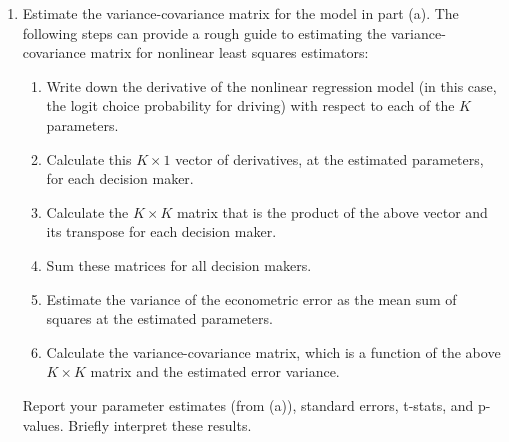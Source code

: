 \documentclass[11pt,letterpaper]{article}\usepackage[]{graphicx}\usepackage[]{color}
\begin{document}
\begin{enumerate}[label=\alph*., leftmargin=*]
	\item Estimate the variance-covariance matrix for the model in part (a). The following steps can provide a rough guide to estimating the variance-covariance matrix for nonlinear least squares estimators:
	\begin{enumerate}[label=\Roman*.]
		\item Write down the derivative of the nonlinear regression model (in this case, the logit choice probability for driving) with respect to each of the $K$ parameters.
		\item Calculate this $K \times 1$ vector of derivatives, at the estimated parameters, for each decision maker.
		\item Calculate the $K \times K$ matrix that is the product of the above vector and its transpose for each decision maker.
		\item Sum these matrices for all decision makers.
		\item Estimate the variance of the econometric error as the mean sum of squares at the estimated parameters.
		\item Calculate the variance-covariance matrix, which is a function of the above $K \times K$ matrix and the estimated error variance.
	\end{enumerate}
	Report your parameter estimates (from (a)), standard errors, t-stats, and p-values. Briefly interpret these results.


\end{enumerate}
\end{document}
